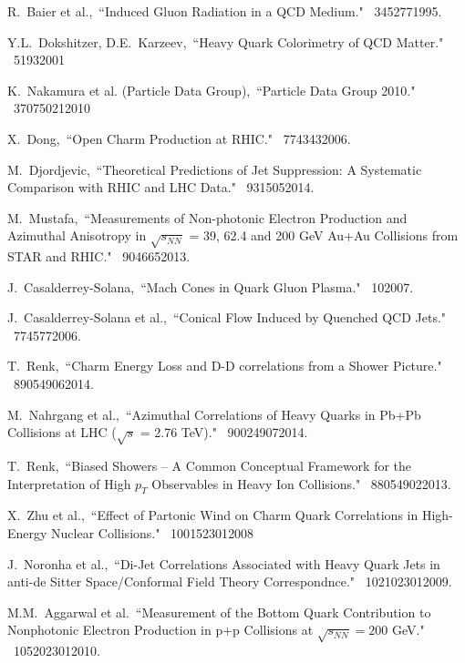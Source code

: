 \begin{thebibliography}{1000}
R.~Baier et al.,~``Induced Gluon Radiation in a QCD Medium." \Journal{\PLB} {~345}{277}{1995}.

Y.L.~Dokshitzer, D.E.~Karzeev,~``Heavy Quark Colorimetry of QCD Matter." \Journal{\PLB} {~519}{3}{2001}

K.~Nakamura et al. (Particle Data Group),~``Particle Data Group 2010." \Journal{\JPG} {~37}{075021}{2010}

X.~Dong,~``Open Charm Production at RHIC." \Journal{\NPA} {~774}{343}{2006}.

M.~Djordjevic,~``Theoretical Predictions of Jet Suppression: A Systematic Comparison with RHIC and LHC Data." \Journal{\NPA} {~931}{505}{2014}.

M.~Mustafa,~``Measurements of Non-photonic Electron Production and Azimuthal Anisotropy in $\sqrt{s_{NN}}$ = 39, 62.4 and 200 GeV Au+Au Collisions from STAR and RHIC." \Journal{\NPA} {~904}{665}{2013}.

J.~Casalderrey-Solana,~``Mach Cones in Quark Gluon Plasma." \Journal{\JPG} {~10}{}{2007}.

J.~Casalderrey-Solana et al.,~``Conical Flow Induced by Quenched QCD Jets." \Journal{\NPA} {~774}{577}{2006}.

T.~Renk,~``Charm Energy Loss and D-D correlations from a Shower Picture." \Journal{\PRC} {~89}{054906}{2014}.

M.~Nahrgang et al.,~``Azimuthal Correlations of Heavy Quarks in Pb+Pb Collisions at LHC ($\sqrt{s}$ = 2.76 TeV)." \Journal{\PRC} {~90}{024907}{2014}.

T.~Renk,~``Biased Showers -- A Common Conceptual Framework for the Interpretation of High $p_T$ Observables in Heavy Ion Collisions." \Journal{\PRC} {~88}{054902}{2013}.

X.~Zhu et al.,~``Effect of Partonic Wind on Charm Quark Correlations in High-Energy Nuclear Collisions." \Journal{\PRL} {~100}{152301}{2008}

J.~Noronha et al.,~``Di-Jet Correlations Associated with Heavy Quark Jets in anti-de Sitter Space/Conformal Field Theory Correspondnce." \Journal{\PRL} {~102}{102301}{2009}.

M.M.~Aggarwal et al.~``Measurement of the Bottom Quark Contribution to Nonphotonic Electron Production in p+p Collisions at $\sqrt{s_{NN}} = 200$ GeV." \Journal{\PRL} {~105}{202301}{2010}.


\end{thebibliography}
